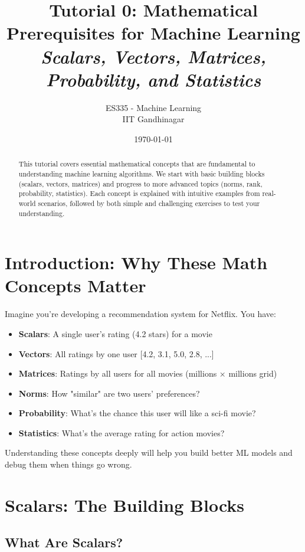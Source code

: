 \documentclass{article}
\title{\textbf{Tutorial 0: Mathematical Prerequisites for Machine Learning} \\ \textit{Scalars, Vectors, Matrices, Probability, and Statistics}}
\author{ES335 - Machine Learning \\ IIT Gandhinagar}
\date{\today}
\newcounter{example}
\newcounter{exercise}
\begin{document}
\maketitle

\begin{abstract}
This tutorial covers essential mathematical concepts that are fundamental to understanding machine learning algorithms. We start with basic building blocks (scalars, vectors, matrices) and progress to more advanced topics (norms, rank, probability, statistics). Each concept is explained with intuitive examples from real-world scenarios, followed by both simple and challenging exercises to test your understanding.
\end{abstract}

\tableofcontents
\newpage

\section{Introduction: Why These Math Concepts Matter}

Imagine you're developing a recommendation system for Netflix. You have:
\begin{itemize}
    \item \textbf{Scalars}: A single user's rating (4.2 stars) for a movie
    \item \textbf{Vectors}: All ratings by one user [4.2, 3.1, 5.0, 2.8, ...]
    \item \textbf{Matrices}: Ratings by all users for all movies (millions × millions grid)
    \item \textbf{Norms}: How "similar" are two users' preferences?
    \item \textbf{Probability}: What's the chance this user will like a sci-fi movie?
    \item \textbf{Statistics}: What's the average rating for action movies?
\end{itemize}

Understanding these concepts deeply will help you build better ML models and debug them when things go wrong.

\section{Scalars: The Building Blocks}

\subsection{What Are Scalars?}
\end{document}
